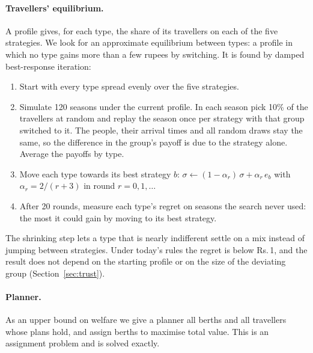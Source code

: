 \documentclass{article}
\newcommand{\rs}{Rs.\,}
\theoremstyle{definition}
\begin{document}
\paragraph{Travellers' equilibrium.} A profile gives, for each type, the share of its
travellers on each of the five strategies. We look for an approximate equilibrium between
types: a profile in which no type gains more than a few rupees by switching. It is found by
damped best-response iteration:
\begin{enumerate}\itemsep0pt
\item Start with every type spread evenly over the five strategies.
\item Simulate 120 seasons under the current profile. In each season pick 10\% of the
travellers at random and replay the season once per strategy with that group switched to
it. The people, their arrival times and all random draws stay the same, so the difference
in the group's payoff is due to the strategy alone. Average the payoffs by type.
\item Move each type towards its best strategy $b$: $\sigma \leftarrow (1-\alpha_r)\,\sigma
+ \alpha_r\, e_b$ with $\alpha_r = 2/(r+3)$ in round $r = 0, 1, \dots$
\item After 20 rounds, measure each type's regret on seasons the search never used: the
most it could gain by moving to its best strategy.
\end{enumerate}
The shrinking step lets a type that is nearly indifferent settle on a mix instead of
jumping between strategies. Under today's rules the regret is below \rs1, and the result
does not depend on the starting profile or on the size of the deviating group
(Section~\ref{sec:trust}).

\paragraph{Planner.} As an upper bound on welfare we give a planner all berths and all
travellers whose plans hold, and assign berths to maximise total value. This is an
assignment problem and is solved exactly.
\end{document}
